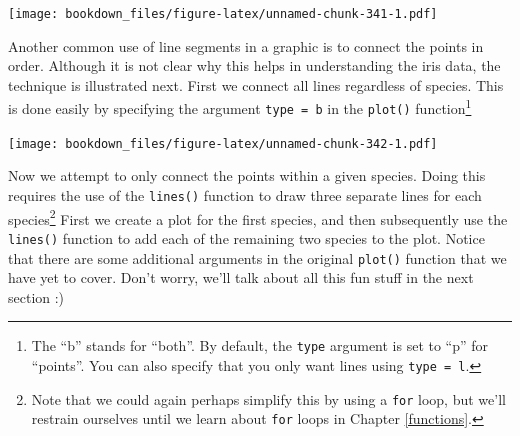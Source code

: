 \documentclass[
]{krantz}
\makeatletter
\newenvironment{Shaded}{\begin{snugshade}}{\end{snugshade}}
\newcommand{\DataTypeTok}[1]{\textcolor[rgb]{0.27,0.27,0.27}{#1}}
\newcommand{\DecValTok}[1]{\textcolor[rgb]{0.06,0.06,0.06}{#1}}
\newcommand{\FloatTok}[1]{\textcolor[rgb]{0.06,0.06,0.06}{#1}}
\newcommand{\KeywordTok}[1]{\textcolor[rgb]{0.27,0.27,0.27}{\textbf{#1}}}
\newcommand{\NormalTok}[1]{#1}
\newcommand{\OperatorTok}[1]{\textcolor[rgb]{0.43,0.43,0.43}{\textbf{#1}}}
\newcommand{\StringTok}[1]{\textcolor[rgb]{0.5,0.5,0.5}{#1}}
\newenvironment{kframe}{%
\medskip{}
\setlength{\fboxsep}{.8em}
 \def\at@end@of@kframe{}%
 \ifinner\ifhmode%
  \def\at@end@of@kframe{\end{minipage}}%
  \begin{minipage}{\columnwidth}%
 \fi\fi%
 \def\FrameCommand##1{\hskip\@totalleftmargin \hskip-\fboxsep
 \colorbox{shadecolor}{##1}\hskip-\fboxsep
     \hskip-\linewidth \hskip-\@totalleftmargin \hskip\columnwidth}%
 \MakeFramed {\advance\hsize-\width
   \@totalleftmargin\z@ \linewidth\hsize
   \@setminipage}}%
 {\par\unskip\endMakeFramed%
 \at@end@of@kframe}
\renewenvironment{Shaded}{\begin{kframe}}{\end{kframe}}
\makeatother
\begin{document}
\texttt{[image: bookdown\_files/figure-latex/unnamed-chunk-341-1.pdf]}

Another common use of line segments in a graphic is to connect the points in order. Although it is not clear why this helps in understanding the iris data, the technique is illustrated next. First we connect all lines regardless of species. This is done easily by specifying the argument \texttt{type\ =\ \textquotesingle{}b\textquotesingle{}} in the \texttt{plot()} function\footnote{The ``b'' stands for ``both''. By default, the \texttt{type} argument is set to ``p'' for ``points''. You can also specify that you only want lines using \texttt{type\ =\ \textquotesingle{}l\textquotesingle{}}.}

\begin{Shaded}
\end{Shaded}

\texttt{[image: bookdown\_files/figure-latex/unnamed-chunk-342-1.pdf]}

Now we attempt to only connect the points within a given species. Doing this requires the use of the \texttt{lines()} function to draw three separate lines for each species\footnote{Note that we could again perhaps simplify this by using a \texttt{for} loop, but we'll restrain ourselves until we learn about \texttt{for} loops in Chapter \ref{functions}.} First we create a plot for the first species, and then subsequently use the \texttt{lines()} function to add each of the remaining two species to the plot. Notice that there are some additional arguments in the original \texttt{plot()} function that we have yet to cover. Don't worry, we'll talk about all this fun stuff in the next section :)
\end{document}
